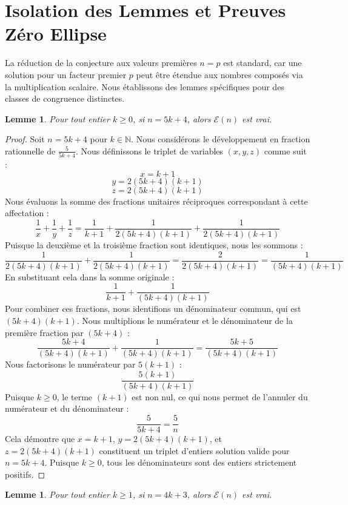 \documentclass[12pt, a4paper]{article}
\newtheorem{lemma}[theorem]{Lemme}
\begin{document}
\section{Isolation des Lemmes et Preuves Z\'ero Ellipse}

La r\'eduction de la conjecture aux valeurs premi\`eres $n = p$ est standard, car une solution pour un facteur premier $p$ peut \^etre \'etendue aux nombres compos\'es via la multiplication scalaire. Nous \'etablissons des lemmes sp\'ecifiques pour des classes de congruence distinctes.

\begin{lemma}
Pour tout entier $k \ge 0$, si $n = 5k + 4$, alors $\mathcal{E}(n)$ est vrai.
\end{lemma}

\begin{proof}
Soit $n = 5k + 4$ pour $k \in \mathbb{N}$. Nous consid\'erons le d\'eveloppement en fraction rationnelle de $\frac{5}{5k+4}$. Nous d\'efinissons le triplet de variables $(x, y, z)$ comme suit :
\[ x = k + 1 \]
\[ y = 2(5k+4)(k+1) \]
\[ z = 2(5k+4)(k+1) \]
Nous \'evaluons la somme des fractions unitaires r\'eciproques correspondant \`a cette affectation :
\[ \frac{1}{x} + \frac{1}{y} + \frac{1}{z} = \frac{1}{k+1} + \frac{1}{2(5k+4)(k+1)} + \frac{1}{2(5k+4)(k+1)} \]
Puisque la deuxi\`eme et la troisi\`eme fraction sont identiques, nous les sommons :
\[ \frac{1}{2(5k+4)(k+1)} + \frac{1}{2(5k+4)(k+1)} = \frac{2}{2(5k+4)(k+1)} = \frac{1}{(5k+4)(k+1)} \]
En substituant cela dans la somme originale :
\[ \frac{1}{k+1} + \frac{1}{(5k+4)(k+1)} \]
Pour combiner ces fractions, nous identifions un d\'enominateur commun, qui est $(5k+4)(k+1)$. Nous multiplions le num\'erateur et le d\'enominateur de la premi\`ere fraction par $(5k+4)$ :
\[ \frac{5k+4}{(5k+4)(k+1)} + \frac{1}{(5k+4)(k+1)} = \frac{5k+5}{(5k+4)(k+1)} \]
Nous factorisons le num\'erateur par $5(k+1)$ :
\[ \frac{5(k+1)}{(5k+4)(k+1)} \]
Puisque $k \ge 0$, le terme $(k+1)$ est non nul, ce qui nous permet de l'annuler du num\'erateur et du d\'enominateur :
\[ \frac{5}{5k+4} = \frac{5}{n} \]
Cela d\'emontre que $x = k+1$, $y = 2(5k+4)(k+1)$, et $z = 2(5k+4)(k+1)$ constituent un triplet d'entiers solution valide pour $n = 5k+4$. Puisque $k \ge 0$, tous les d\'enominateurs sont des entiers strictement positifs.
\end{proof}

\begin{lemma}
Pour tout entier $k \ge 1$, si $n = 4k + 3$, alors $\mathcal{E}(n)$ est vrai.
\end{lemma}
\end{document}
